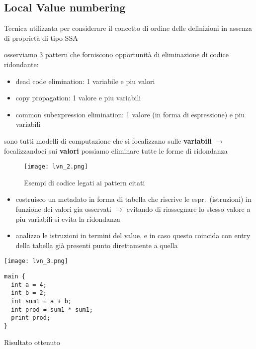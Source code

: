 \subsection{Local Value numbering}

Tecnica utilizzata per considerare il concetto di ordine delle definizioni in assenza di propriet\`a di tipo SSA

osserviamo 3 pattern che forniscono opportunit\`a di eliminazione di codice ridondante:
\begin{itemize}
  \item dead code elimination: 1 variabile e piu valori
  \item copy propagation: 1 valore e piu variabili
  \item common subexpression elimination: 1 valore (in forma di espressione) e piu variabili
\end{itemize}

sono tutti modelli di computazione che si focalizzano sulle \textbf{variabili} $\rightarrow$ focalizzandoci sui \textbf{valori} possiamo eliminare tutte le forme di ridondanza

\begin{figure}[h]
  \centering
  \texttt{[image: lvn\_2.png]}
  \caption{Esempi di codice legati ai pattern citati}
\end{figure}

\begin{itemize}
  \item costruisco un metadato in forma di tabella che riscrive le espr.~(istruzioni) in funzione dei valori gia osservati $\rightarrow$ evitando di riassegnare lo stesso valore a piu variabili si evita la ridondanza
  \item analizzo le istruzioni in termini del value, e in caso questo coincida con entry della tabella gi\`a presenti punto direttamente a quella
\end{itemize}

\begin{example}
  \noindent\begin{minipage}[c]{.6\textwidth}
    \texttt{[image: lvn\_3.png]}
  \end{minipage}\hfill
  \begin{minipage}[c]{.3\textwidth}
    \centering
    \begin{lstlisting}
main {
  int a = 4;
  int b = 2;
  int sum1 = a + b;
  int prod = sum1 * sum1;
  print prod;
}\end{lstlisting}

  Risultato ottenuto
\end{minipage}
\end{example}


